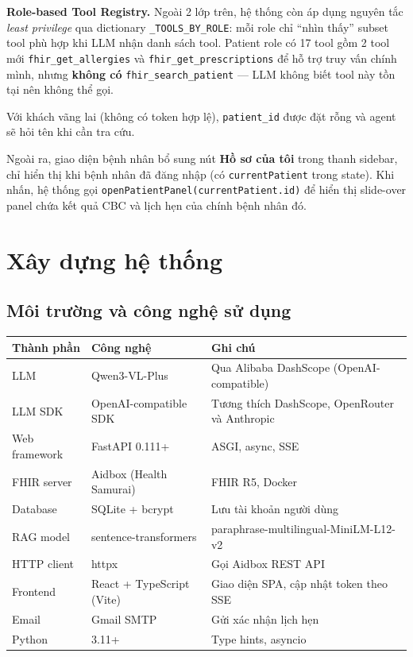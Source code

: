 \documentclass[a4paper,13pt,3p,twoside,openany]{report}
\theoremstyle{definition}
\theoremstyle{remark}
\theoremstyle{definition}
\let\ORIGsection\section
\renewcommand{\section}{\needspace{3\baselineskip}\ORIGsection}
\begin{document}
\textbf{Role-based Tool Registry.} Ngoài 2 lớp trên, hệ thống còn áp dụng nguyên tắc \textit{least privilege} qua dictionary \texttt{\_TOOLS\_BY\_ROLE}: mỗi role chỉ ``nhìn thấy'' subset tool phù hợp khi LLM nhận danh sách tool. Patient role có 17 tool gồm 2 tool mới \texttt{fhir\_get\_allergies} và \texttt{fhir\_get\_prescriptions} để hỗ trợ truy vấn chính mình, nhưng \textbf{không có} \texttt{fhir\_search\_patient} --- LLM không biết tool này tồn tại nên không thể gọi.

Với khách vãng lai (không có token hợp lệ), \texttt{patient\_id} được đặt rỗng và agent sẽ hỏi tên khi cần tra cứu.

Ngoài ra, giao diện bệnh nhân bổ sung nút \textbf{Hồ sơ của tôi} trong thanh sidebar, chỉ hiển thị khi bệnh nhân đã đăng nhập (có \texttt{currentPatient} trong state). Khi nhấn, hệ thống gọi \texttt{openPatientPanel(currentPatient.id)} để hiển thị slide-over panel chứa kết quả CBC và lịch hẹn của chính bệnh nhân đó.

\chapter{Xây dựng hệ thống}

\section{Môi trường và công nghệ sử dụng}

\begin{table}[H]
\centering
\begin{tabular}{|l|l|p{6cm}|}
\hline
\textbf{Thành phần} & \textbf{Công nghệ} & \textbf{Ghi chú} \\
\hline
LLM & Qwen3-VL-Plus & Qua Alibaba DashScope (OpenAI-compatible) \\
\hline
LLM SDK & OpenAI-compatible SDK & Tương thích DashScope, OpenRouter và Anthropic \\
\hline
Web framework & FastAPI 0.111+ & ASGI, async, SSE \\
\hline
FHIR server & Aidbox (Health Samurai) & FHIR R5, Docker \\
\hline
Database & SQLite + bcrypt & Lưu tài khoản người dùng \\
\hline
RAG model & sentence-transformers & paraphrase-multilingual-MiniLM-L12-v2 \\
\hline
HTTP client & httpx & Gọi Aidbox REST API \\
\hline
Frontend & React + TypeScript (Vite) & Giao diện SPA, cập nhật token theo SSE \\
\hline
Email & Gmail SMTP & Gửi xác nhận lịch hẹn \\
\hline
Python & 3.11+ & Type hints, asyncio \\
\hline
\end{tabular}
\end{table}
\end{document}
